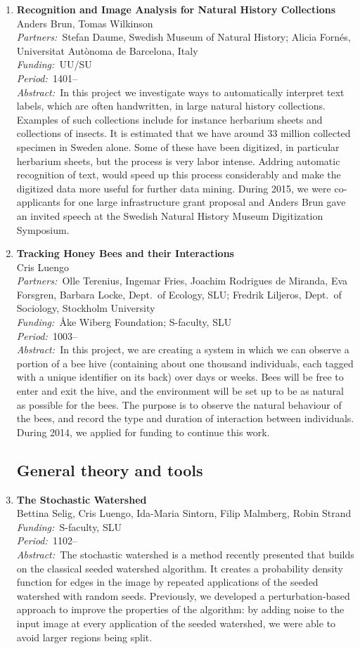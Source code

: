 \documentclass[10pt, a4paper]{article}
\newcommand{\period}{\emph{Period:~}}
\newcommand{\aabstract}[1]{\emph{Abstract:~}#1}
\newcommand{\ffunding}[1]{\emph{Funding:~}#1\\}
\newcommand{\ppartners}[1]{\emph{Partners:~}#1\\}
\newcommand{\pperiod}[1]{\emph{Period:~}#1\\}
\begin{document}
{\begin{enumerate}
\item \textbf{Recognition and Image Analysis for Natural History Collections}\\
Anders Brun, Tomas Wilkinson\\
\ppartners{Stefan Daume, Swedish Museum of Natural History; Alicia Forn\' es, Universitat Aut\` onoma de Barcelona, Italy}
\ffunding{UU/SU}
\pperiod{1401--}
\aabstract{In this project we investigate ways to automatically interpret text labels, which are often handwritten, in large natural history collections. Examples of such collections include for instance herbarium sheets and collections of insects. It is estimated that we have around 33 million collected specimen in Sweden alone. Some of these have been digitized, in particular herbarium sheets, but the process is very labor intense. Addring automatic recognition of text, would speed up this process considerably and make the digitized data more useful for further data mining. During 2015, we were co-applicants for one large infrastructure grant proposal and Anders Brun gave an invited speech at the Swedish Natural History Museum Digitization Symposium.}


\item 
\label{proj:honey_bees}
\textbf{Tracking Honey Bees and their Interactions}\\
Cris Luengo\\
\ppartners{Olle Terenius, Ingemar Fries, Joachim Rodrigues de Miranda, Eva Forsgren, Barbara Locke, Dept.~of Ecology, SLU; Fredrik Liljeros, Dept.~of Sociology, Stockholm University}
\ffunding{{\AA}ke Wiberg Foundation; S-faculty, SLU}
\period{1003--}\\
\aabstract{In this project, we are creating a system in which we can observe a portion of a bee hive (containing about one thousand individuals, each tagged with a unique identifier on its back) over days or weeks. Bees will be free to enter and exit the hive, and the environment will be set up to be as natural as possible for the bees. The purpose is to observe the natural behaviour of the bees, and record the type and duration of interaction between individuals. During 2014, we applied for funding to continue this work.}

\subsection{General theory and tools}

\item
\label{proj:stochwatershed}
\textbf{The Stochastic Watershed}\\
Bettina Selig, Cris Luengo, Ida-Maria Sintorn, Filip Malmberg, Robin Strand\\
\ffunding{S-faculty, SLU}
\pperiod{1102--}
\aabstract{The stochastic watershed is a method recently presented that builds on the classical seeded watershed algorithm. It creates a probability density function for edges in the image by repeated applications of the seeded watershed with random seeds. Previously, we developed a perturbation-based approach to improve the properties of the algorithm: by adding noise to the input image at every application of the seeded watershed, we were able to avoid larger regions being split.

}
\end{enumerate}}
\end{document}
